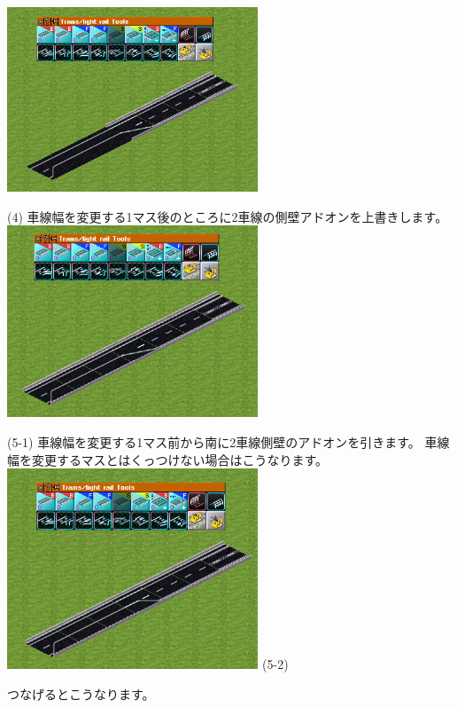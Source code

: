 \documentclass{jarticle}
\begin{document}
\begin{multicols}{2}
\includegraphics[width = 75mm]{picture/20210214-road-4-4.png}

(4)
車線幅を変更する1マス後のところに2車線の側壁アドオンを上書きします。\\



\includegraphics[width = 75mm]{picture/20210214-road-4-6.png}

(5-1)
車線幅を変更する1マス前から南に2車線側壁のアドオンを引きます。
車線幅を変更するマスとはくっつけない場合はこうなります。\\


\includegraphics[width = 75mm]{picture/20210214-road-4-7.png}
(5-2)

つなげるとこうなります。

\end{multicols}

\newpage
\end{document}
